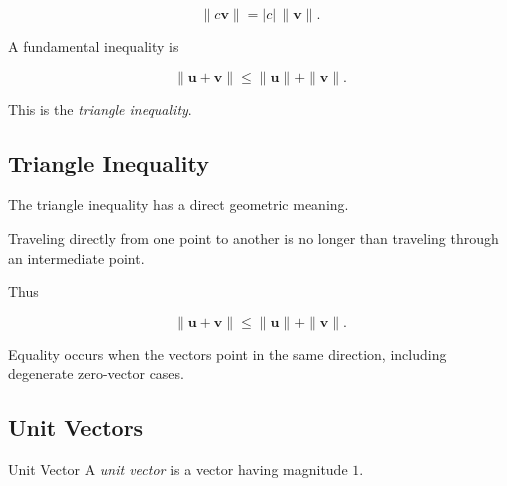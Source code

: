 \[ \boxed{\|c\mathbf{v}\|=|c|\,\|\mathbf{v}\|.} \]

A fundamental inequality is

\[ \boxed{\|\mathbf{u}+\mathbf{v}\|\leq\|\mathbf{u}\|+\|\mathbf{v}\|.} \]

This is the \emph{triangle inequality}.

\subsection{Triangle Inequality}
\label{subsec:vector-triangle-inequality}

The triangle inequality has a direct geometric meaning.

Traveling directly from one point to another is no longer than traveling
through an intermediate point.

\begin{centereddiagram}
\end{centereddiagram}

Thus

\[ \|\mathbf{u}+\mathbf{v}\|\leq\|\mathbf{u}\|+\|\mathbf{v}\|. \]

Equality occurs when the vectors point in the same direction, including
degenerate zero-vector cases.

\subsection{Unit Vectors}
\label{subsec:unit-vectors}

\begin{definitionbox}{Unit Vector}
A \emph{unit vector} is a vector having magnitude \(1\).
\end{definitionbox}


